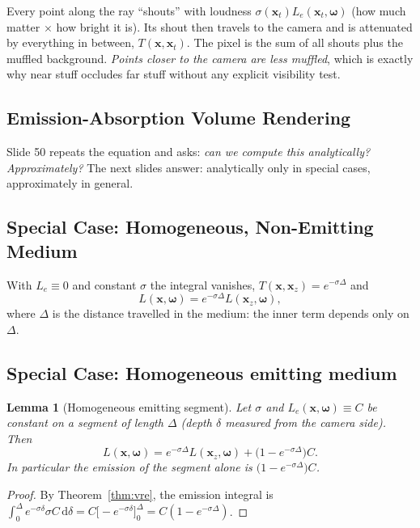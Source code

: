 \documentclass[11pt,a4paper]{article}
\newcommand{\x}{{\bm{x}}}
\newcommand{\w}{{\bm{\omega}}}
\theoremstyle{definition}
\theoremstyle{plain}
\newtheorem{lemma}[definition]{Lemma}
\theoremstyle{remark}
\begin{document}
\begin{intuition}
Every point along the ray ``shouts'' with loudness $\sigma(\x_t)L_e(\x_t,\w)$ (how much matter $\times$ how bright it is). Its shout then travels to the camera and is attenuated by everything in between, $T(\x,\x_t)$. The pixel is the sum of all shouts plus the muffled background. \emph{Points closer to the camera are less muffled}, which is exactly why near stuff occludes far stuff without any explicit visibility test.
\end{intuition}

\subsection{Emission-Absorption Volume Rendering}

Slide 50 repeats the equation and asks: \emph{can we compute this analytically? Approximately?} The next slides answer: analytically only in special cases, approximately in general.

\subsection{Special Case: Homogeneous, Non-Emitting Medium}

With $L_e\equiv0$ and constant $\sigma$ the integral vanishes, $T(\x,\x_z)=e^{-\sigma\Delta}$ and
\[
L(\x,\w)=e^{-\sigma\Delta}L(\x_z,\w),
\]
where $\Delta$ is the distance travelled in the medium: the inner term depends only on $\Delta$.

\subsection{Special Case: Homogeneous emitting medium}

\begin{lemma}[Homogeneous emitting segment]\label{lem:homog}
Let $\sigma$ and $L_e(\x,\w)\equiv C$ be constant on a segment of length $\Delta$ (depth $\delta$ measured from the camera side). Then
\[
L(\x,\w)=e^{-\sigma\Delta}L(\x_z,\w)+\bigl(1-e^{-\sigma\Delta}\bigr)C .
\]
In particular the emission of the segment alone is $\bigl(1-e^{-\sigma\Delta}\bigr)C$.
\end{lemma}
\begin{proof}
By Theorem~\ref{thm:vre}, the emission integral is $\int_0^\Delta e^{-\sigma\delta}\sigma C\,\mathrm d\delta=C\bigl[-e^{-\sigma\delta}\bigr]_0^\Delta=C(1-e^{-\sigma\Delta})$.
\end{proof}
\end{document}
